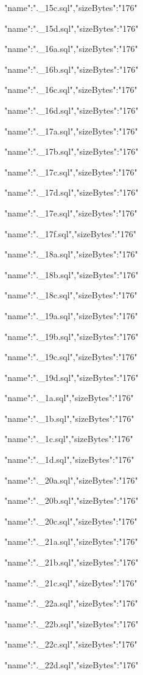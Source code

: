 \documentclass[11pt,a4paper]{article}
\begin{document}
{"name":".\_15c.sql","sizeBytes":"176"}

{"name":".\_15d.sql","sizeBytes":"176"}

{"name":".\_16a.sql","sizeBytes":"176"}

{"name":".\_16b.sql","sizeBytes":"176"}

{"name":".\_16c.sql","sizeBytes":"176"}

{"name":".\_16d.sql","sizeBytes":"176"}

{"name":".\_17a.sql","sizeBytes":"176"}

{"name":".\_17b.sql","sizeBytes":"176"}

{"name":".\_17c.sql","sizeBytes":"176"}

{"name":".\_17d.sql","sizeBytes":"176"}

{"name":".\_17e.sql","sizeBytes":"176"}

{"name":".\_17f.sql","sizeBytes":"176"}

{"name":".\_18a.sql","sizeBytes":"176"}

{"name":".\_18b.sql","sizeBytes":"176"}

{"name":".\_18c.sql","sizeBytes":"176"}

{"name":".\_19a.sql","sizeBytes":"176"}

{"name":".\_19b.sql","sizeBytes":"176"}

{"name":".\_19c.sql","sizeBytes":"176"}

{"name":".\_19d.sql","sizeBytes":"176"}

{"name":".\_1a.sql","sizeBytes":"176"}

{"name":".\_1b.sql","sizeBytes":"176"}

{"name":".\_1c.sql","sizeBytes":"176"}

{"name":".\_1d.sql","sizeBytes":"176"}

{"name":".\_20a.sql","sizeBytes":"176"}

{"name":".\_20b.sql","sizeBytes":"176"}

{"name":".\_20c.sql","sizeBytes":"176"}

{"name":".\_21a.sql","sizeBytes":"176"}

{"name":".\_21b.sql","sizeBytes":"176"}

{"name":".\_21c.sql","sizeBytes":"176"}

{"name":".\_22a.sql","sizeBytes":"176"}

{"name":".\_22b.sql","sizeBytes":"176"}

{"name":".\_22c.sql","sizeBytes":"176"}

{"name":".\_22d.sql","sizeBytes":"176"}
\end{document}
